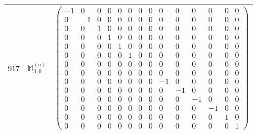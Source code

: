 \documentclass[fleqn,8pt,landscape]{jsarticle}
\begin{document}
\begin{center}
\begin{longtable}{ccc}
$ 917 $ & $ \mathbb{M}_{3,0}^{(a)} $ & $ \begin{pmatrix} -1 & 0 & 0 & 0 & 0 & 0 & 0 & 0 & 0 & 0 & 0 & 0 & 0 & 0 \\ 0 & -1 & 0 & 0 & 0 & 0 & 0 & 0 & 0 & 0 & 0 & 0 & 0 & 0 \\ 0 & 0 & 1 & 0 & 0 & 0 & 0 & 0 & 0 & 0 & 0 & 0 & 0 & 0 \\ 0 & 0 & 0 & 1 & 0 & 0 & 0 & 0 & 0 & 0 & 0 & 0 & 0 & 0 \\ 0 & 0 & 0 & 0 & 1 & 0 & 0 & 0 & 0 & 0 & 0 & 0 & 0 & 0 \\ 0 & 0 & 0 & 0 & 0 & 1 & 0 & 0 & 0 & 0 & 0 & 0 & 0 & 0 \\ 0 & 0 & 0 & 0 & 0 & 0 & 0 & 0 & 0 & 0 & 0 & 0 & 0 & 0 \\ 0 & 0 & 0 & 0 & 0 & 0 & 0 & 0 & 0 & 0 & 0 & 0 & 0 & 0 \\ 0 & 0 & 0 & 0 & 0 & 0 & 0 & 0 & -1 & 0 & 0 & 0 & 0 & 0 \\ 0 & 0 & 0 & 0 & 0 & 0 & 0 & 0 & 0 & -1 & 0 & 0 & 0 & 0 \\ 0 & 0 & 0 & 0 & 0 & 0 & 0 & 0 & 0 & 0 & -1 & 0 & 0 & 0 \\ 0 & 0 & 0 & 0 & 0 & 0 & 0 & 0 & 0 & 0 & 0 & -1 & 0 & 0 \\ 0 & 0 & 0 & 0 & 0 & 0 & 0 & 0 & 0 & 0 & 0 & 0 & 1 & 0 \\ 0 & 0 & 0 & 0 & 0 & 0 & 0 & 0 & 0 & 0 & 0 & 0 & 0 & 1 \end{pmatrix} $ \\ \hline

\end{longtable}
\end{center}
\end{document}
